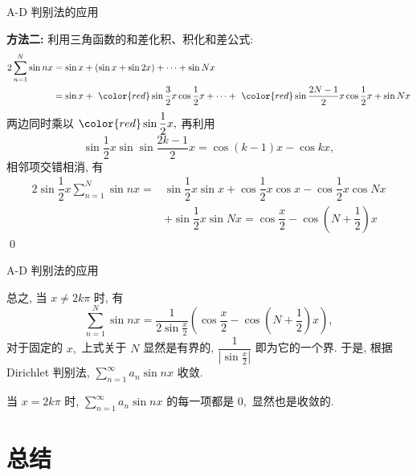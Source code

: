 
\begin{frame}{A-D 判别法的应用}

\textbf{方法二:} 利用三角函数的和差化积、积化和差公式:
\begin{align*}
2\sum\limits_{n=1}^N \sin nx & = \sin x + \left( \sin x + \sin 2x \right) + \cdots + \sin Nx \\
& = \sin x + ~ {\color{red} \sin \dfrac{3}{2}x} \cos \dfrac{1}{2}x + \cdots + ~ {\color{red} \sin \dfrac{2N-1}{2}x} \cos \dfrac{1}{2}x + \sin Nx
\end{align*}
\pause
两边同时乘以 ${\color{red} \sin \dfrac{1}{2}x},$ 再利用
\[\sin \dfrac{1}{2}x \sin \sin \dfrac{2k-1}{2}x = \cos (k-1)x - \cos kx,\]
相邻项交错相消, 有
\begin{align*}
2\sin \dfrac{1}{2}x\sum\limits_{n=1}^N \sin nx
= & \sin \dfrac{1}{2}x \sin x + \cos \dfrac{1}{2}x \cos x - \cos \dfrac{1}{2}x \cos Nx \\
& + \sin \dfrac{1}{2}x \sin Nx
= \cos\dfrac{x}{2} - \cos \left(N + \dfrac{1}{2}\right) x
\end{align*}
\qed

\end{frame}


\begin{frame}{A-D 判别法的应用}

总之, 当 $x \neq 2k\pi$ 时, 有
\[\sum\limits_{n=1}^N \sin nx = \dfrac{1}{2\sin\frac{x}{2}} \left( \cos\dfrac{x}{2} - \cos \left(N + \dfrac{1}{2}\right) x \right),\]
对于固定的 $x,$ 上式关于 $N$ 显然是有界的, $\dfrac{1}{\left\lvert \sin\frac{x}{2} \right\rvert}$ 即为它的一个界. 于是, 根据 Dirichlet 判别法, $\sum\limits_{n=1}^\infty a_n \sin nx$ 收敛.

\pause
\vspace{0.6em}

当 $x = 2k\pi$ 时, $\sum\limits_{n=1}^\infty a_n \sin nx$ 的每一项都是 $0,$ 显然也是收敛的.

\end{frame}


\section{总结}


